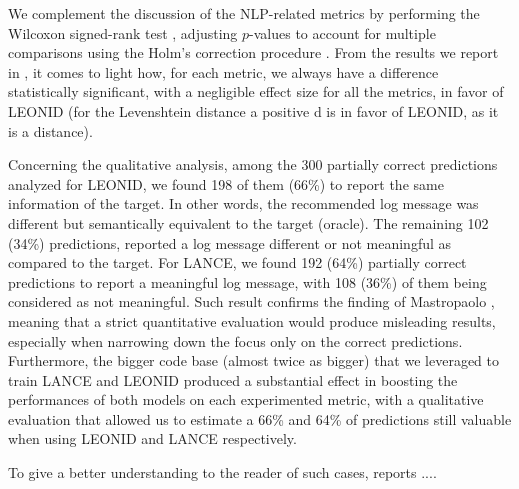 We complement the discussion of the NLP-related metrics by performing the Wilcoxon signed-rank test \cite{wilcoxon}, adjusting $p$-values to account for multiple comparisons using the Holm's correction procedure \cite{Holm1979a}. 
From the results we report in , it comes to light how, for each metric, we always have a difference statistically significant, with a negligible effect size for all the metrics, in favor of LEONID (for the Levenshtein distance a positive d is in favor of LEONID, as it is a distance). 

Concerning the qualitative analysis, among the 300 partially correct predictions analyzed for LEONID, we found 198 of them (66\%) to report the same information of the target. In other words, the recommended log message was different but semantically equivalent to the target (\ie oracle). The remaining 102 (34\%) predictions, reported a log message different or not meaningful as compared to the target. 
For LANCE, we found 192 (64\%)  partially correct predictions to report a meaningful log message, with 108 (36\%) of them being considered as not meaningful.
Such result confirms the finding of Mastropaolo \etal \cite{mastropaolo2022using}, meaning that a strict quantitative evaluation would produce misleading results, especially when narrowing down the focus only on the correct predictions. 
Furthermore, the bigger code base (almost twice as bigger) that we leveraged to train LANCE and LEONID produced a substantial effect in boosting the performances of both models on each experimented metric, with a qualitative evaluation that allowed us to estimate a 66\% and 64\% of predictions still valuable when using LEONID and LANCE respectively.

To give a better understanding to the reader of such cases, \figref{} reports .... 









